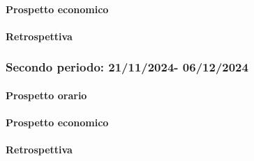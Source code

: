 \paragraph{Prospetto economico}
\paragraph{Retrospettiva}

\subsubsection{Secondo periodo: 21/11/2024- 06/12/2024}
\paragraph{Prospetto orario}
\paragraph{Prospetto economico}
\paragraph{Retrospettiva}
